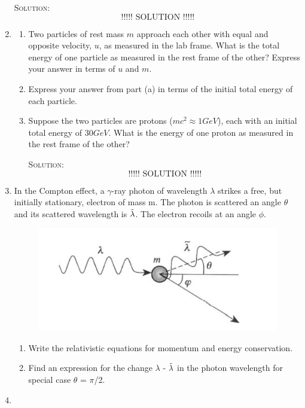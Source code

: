 \begin{enumerate}
\textsc{Solution:}\\
\[
\text{!!!!! SOLUTION !!!!!}
\]

\item \begin{enumerate}
    \item Two particles of rest mass $m$ approach each other with equal and opposite velocity, $u$, as measured in the lab frame. What is the total energy of one particle as measured in the rest frame of the other? Express your answer in terms of $u$ and $m$.
    
    \item Express your answer from part (a) in terms of the initial total energy of each particle.
    
    \item Suppose the two particles are protons ($mc^2 \approx 1 GeV$), each with an initial total energy of $30 GeV$. What is the energy of one proton as measured in the rest frame of the other?

\textsc{Solution:}\\
\[
\text{!!!!! SOLUTION !!!!!}
\]

\end{enumerate}
\item In the Compton effect, a $\gamma$-ray photon of wavelength $\lambda$ strikes a free, but initially stationary, electron of mass m. The photon is scattered an angle $\theta$ and its scattered wavelength is $\Tilde{\lambda}$. The electron recoils at an angle $\phi$.
\begin{figure}[htp]
    \centering
    \includegraphics{mainmatter/wave2.PNG}
    \caption{}
    \label{fig:my_label}
\end{figure}
\begin{enumerate}
    \item Write the relativistic equations for momentum and energy conservation.
    \item Find an expression for the change $\lambda$ - $\Tilde{\lambda}$ in the photon wavelength for special case $\theta$ = $\pi$/2. 
\end{enumerate}
\item 
\end{enumerate}